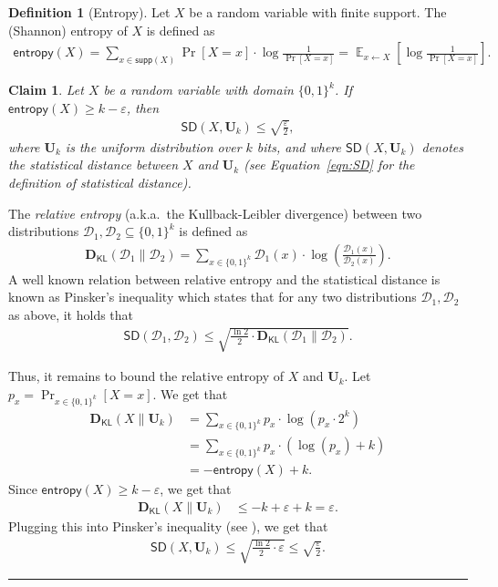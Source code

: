 \documentclass[11pt]{article}
\theoremstyle{plain}
\newtheorem{claim}[theorem]{Claim}
\theoremstyle{definition}
\newtheorem{definition}[theorem]{Definition}
\numberwithin{equation}{section}
\newcommand{\qedsymb}{\hfill{\rule{2mm}{2mm}}}
\renewenvironment{proof}{\begin{trivlist} \item[\hspace{\labelsep}{\bf
\noindent Proof.\/}] }{\qedsymb\end{trivlist}}
\numberwithin{equation}{section} \newcommand{\aka} {also known as\ }
\renewcommand{\aka} {a.k.a.\ }
\newcommand\E{\mathop{\mathbb E}}
\newcommand{\U}{\mathbf U}
\newcommand{\B}{\{ 0,1 \}}
\def\eps{\varepsilon}
\newcommand{\1}{\mathbf{1}}
\newcommand{\D}{\mathcal D}
\newcommand{\SD}{\mathsf{SD}}
\def\({\left(}
\def\){\right)}
\newcommand{\supp}{\mathsf{supp}}
\newcommand{\ent}{\mathsf{entropy}}
\theoremstyle{remark}
\def\({\left(}
\def\){\right)}
\begin{document}
\begin{definition}[Entropy]\label{def:entropy}
  Let $X$ be a random variable with finite support. The (Shannon) entropy of $X$
  is defined as
  \begin{align*}
    \ent(X) = \sum_{x\in\supp(X)} \Pr[X=x] \cdot \log \frac{1}{\Pr[X=x]} =
    \E_{x\leftarrow X}\left[ \log \frac{1}{\Pr[X=x]}\right].
  \end{align*}
\end{definition}

\begin{claim}\label{claim:ent2sd}
  Let $X$ be a random variable with domain $\B^k$. If $\ent(X) \geq
  k-\eps$, then
  \begin{align*}
    \SD(X, \U_k) \leq \sqrt{\frac{\eps}{2}},
  \end{align*}
  where $\U_k$ is the uniform distribution over $k$ bits, and where $\SD(X, \U_k)$ denotes the statistical distance between $X$ and $\U_k$ (see Equation~\eqref{eqn:SD} for the definition of statistical distance).
\end{claim}
\newcommand{\RE}{\mathbf{D}_{\mathsf{KL}}}
\begin{proof}
  The \emph{relative entropy} (\aka the Kullback-Leibler divergence) between two
  distributions $\D_1,\D_2\subseteq \B^k$ is defined as
  \begin{align*}
    \RE(\D_1\|\D_2) = \sum_{x\in\B^k}\D_1(x)\cdot \log\( \frac{\D_1(x)}{\D_2(x)}
    \).
  \end{align*}
  A well known relation between relative entropy and the statistical distance is
  known as Pinsker's inequality which states that for any two distributions
  $\D_1,\D_2$ as above, it holds that
  \begin{align}\label{eq:pinsker}
    \SD(\D_1,\D_2) \leq \sqrt{\frac{\ln 2}{2}\cdot \RE(\D_1\|\D_2)}.
  \end{align}

  Thus, it remains to bound the relative entropy of $X$ and $\U_k$. Let $p_x =
  \Pr_{x\in\B^k}[X=x]$. We get that
  \begin{align*}
    \RE(X\|\U_k) & = \sum_{x\in\B^k}p_x\cdot \log\( p_x\cdot 2^{k} \)\\
    & = \sum_{x\in\B^k}p_x\cdot \(\log (p_x) + k \)\\
    & = -\ent(X) + k.
  \end{align*}
  Since $\ent(X) \geq k-\eps$, we get that
  \begin{align*}
    \RE(X\|\U_k) & \leq -k + \eps +k = \eps.
  \end{align*}
  Plugging this into Pinsker's inequality (see ), we get that
  \begin{align*}
    \SD(X, \U_k) \leq \sqrt{\frac{\ln 2}{2}\cdot \eps}\leq \sqrt{\frac{\eps}{2}}.
  \end{align*}
\end{proof}
\end{document}
